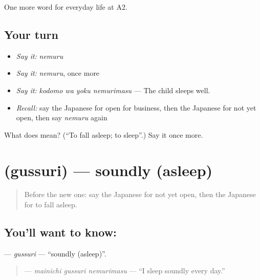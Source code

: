 \begin{grammarlens}[title={What you've built}]
One more word for everyday life at A2.
\end{grammarlens}

\subsection*{Your turn}
\begin{itemize}
\raggedright
  \item \emph{Say it:} \emph{nemuru}
  \item \emph{Say it:} \emph{nemuru}, once more
  \item \emph{Say it:} \emph{kodomo wa yoku nemurimasu} — The child sleeps well.
  \item \emph{Recall:} say the Japanese for open for business, then the Japanese for not yet open, then say \emph{nemuru} again
\end{itemize}

\begin{tcolorbox}[breakable,colback=teal!4,colframe=teal!35!black,title={Before you move on}]
What does  mean? (\textquotedblleft{}To fall asleep; to sleep\textquotedblright{}.) Say it once more.
\end{tcolorbox}
\section[\texorpdfstring{\ja{ぐっすり} (gussuri)}{ぐっすり (gussuri)}]{ (gussuri) — soundly (asleep)}

\label{lesson:JA-C146-gussuri}



\begin{quote}
Before the new one: say the Japanese for not yet open, then the Japanese for to fall asleep.
\end{quote}

\subsection*{You'll want to know: }
\textbf{} — \emph{gussuri} — \textquotedblleft{}soundly (asleep)\textquotedblright{}.

\begin{quote}
\textbf{  } — \emph{mainichi gussuri nemurimasu} — \textquotedblleft{}I sleep soundly every day.\textquotedblright{}
\end{quote}

